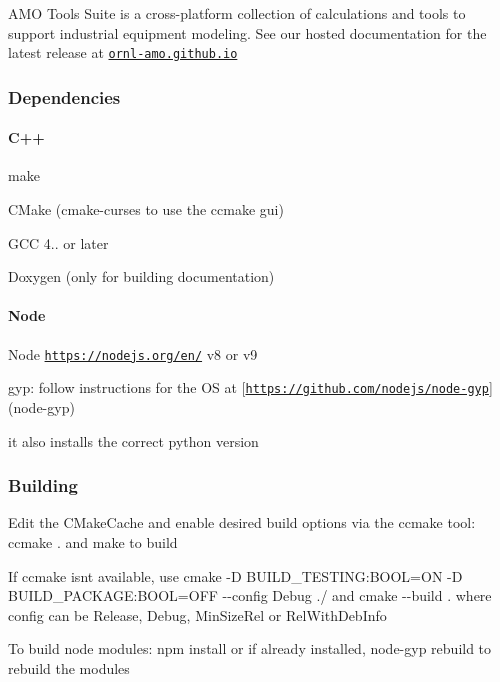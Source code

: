 A\+MO Tools Suite is a cross-\/platform collection of calculations and tools to support industrial equipment modeling. See our hosted documentation for the latest release at \href{https://ornl-amo.github.io/}{\tt ornl-\/amo.\+github.\+io}

\subsubsection*{Dependencies}

\paragraph*{C++}


\begin{DoxyItemize}
\item make
\item C\+Make (cmake-\/curses to use the ccmake gui)
\item G\+CC 4.. or later
\item Doxygen (only for building documentation)
\end{DoxyItemize}

\paragraph*{Node}


\begin{DoxyItemize}
\item Node \href{https://nodejs.org/en/}{\tt https\+://nodejs.\+org/en/} v8 or v9
\item gyp\+: follow instructions for the OS at \mbox{[}\href{https://github.com/nodejs/node-gyp}{\tt https\+://github.\+com/nodejs/node-\/gyp}\mbox{]}(node-\/gyp)
\begin{DoxyItemize}
\item it also installs the correct python version
\end{DoxyItemize}
\end{DoxyItemize}

\subsubsection*{Building}


\begin{DoxyItemize}
\item Edit the C\+Make\+Cache and enable desired build options via the ccmake tool\+: {\ttfamily ccmake .} and {\ttfamily make} to build
\item If ccmake isn\textquotesingle{}t available, use {\ttfamily cmake -\/D B\+U\+I\+L\+D\+\_\+\+T\+E\+S\+T\+I\+NG\+:B\+O\+OL=ON -\/D B\+U\+I\+L\+D\+\_\+\+P\+A\+C\+K\+A\+GE\+:B\+O\+OL=O\+FF -\/-\/config Debug ./} and {\ttfamily cmake -\/-\/build .} where config can be {\ttfamily Release}, {\ttfamily Debug}, {\ttfamily Min\+Size\+Rel} or {\ttfamily Rel\+With\+Deb\+Info}
\item To build node modules\+: {\ttfamily npm install} or if already installed, {\ttfamily node-\/gyp rebuild} to rebuild the modules
\end{DoxyItemize}

